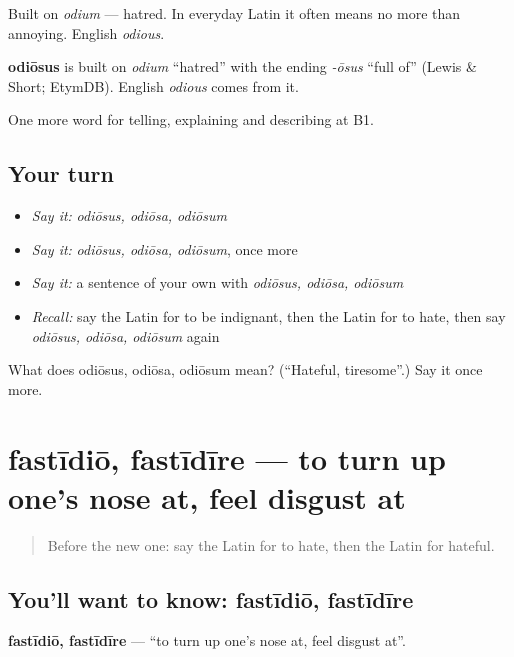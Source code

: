 Built on \emph{odium} — hatred. In everyday Latin it often means no more than annoying. English \emph{odious}.

\begin{cousinweb}
\textbf{odiōsus} is built on \emph{odium} \textquotedblleft{}hatred\textquotedblright{} with the ending \emph{-ōsus} \textquotedblleft{}full of\textquotedblright{} (Lewis \& Short; EtymDB). English \emph{odious} comes from it.
\end{cousinweb}

\begin{grammarlens}[title={What you've built}]
One more word for telling, explaining and describing at B1.
\end{grammarlens}

\subsection*{Your turn}
\begin{itemize}
\raggedright
  \item \emph{Say it:} \emph{odiōsus, odiōsa, odiōsum}
  \item \emph{Say it:} \emph{odiōsus, odiōsa, odiōsum}, once more
  \item \emph{Say it:} a sentence of your own with \emph{odiōsus, odiōsa, odiōsum}
  \item \emph{Recall:} say the Latin for to be indignant, then the Latin for to hate, then say \emph{odiōsus, odiōsa, odiōsum} again
\end{itemize}

\begin{tcolorbox}[breakable,colback=teal!4,colframe=teal!35!black,title={Before you move on}]
What does odiōsus, odiōsa, odiōsum mean? (\textquotedblleft{}Hateful, tiresome\textquotedblright{}.) Say it once more.
\end{tcolorbox}
\section[fastīdiō, fastīdīre]{fastīdiō, fastīdīre — to turn up one's nose at, feel disgust at}

\label{lesson:LA-C494-fastidio}



\begin{quote}
Before the new one: say the Latin for to hate, then the Latin for hateful.
\end{quote}

\subsection*{You'll want to know: fastīdiō, fastīdīre}
\textbf{fastīdiō, fastīdīre} — \textquotedblleft{}to turn up one's nose at, feel disgust at\textquotedblright{}.

